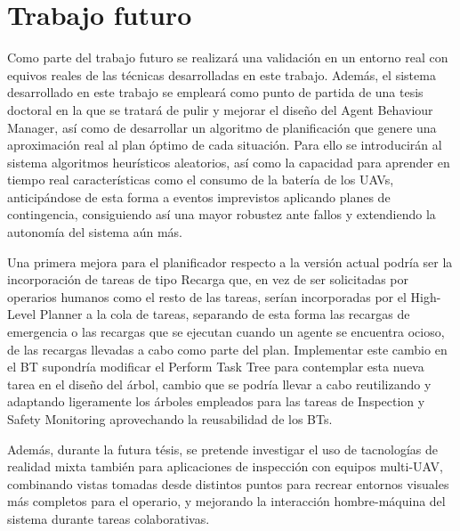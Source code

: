 \documentclass[fontsize=11pt, English=false, Español=true, Myfinal=true, twoside, numbers=noenddot]{scrbook}
\begin{document}
\section{Trabajo futuro}
\label{sec:FutureWork}
Como parte del trabajo futuro se realizará una validación en un entorno real con equivos reales de las técnicas desarrolladas en este trabajo. Además, el sistema desarrollado en este trabajo se empleará como punto de partida de una tesis doctoral en la que se tratará de pulir y mejorar el diseño del Agent Behaviour Manager, así como de desarrollar un algoritmo de planificación que genere una aproximación real al plan óptimo de cada situación. Para ello se introducirán al sistema algoritmos heurísticos aleatorios, así como la capacidad para aprender en tiempo real características como el consumo de la batería de los UAVs, anticipándose de esta forma a eventos imprevistos aplicando planes de contingencia, consiguiendo así una mayor robustez ante fallos y extendiendo la autonomía del sistema aún más.

Una primera mejora para el planificador respecto a la versión actual podría ser la incorporación de tareas de tipo Recarga que, en vez de ser solicitadas por operarios humanos como el resto de las tareas, serían incorporadas por el High-Level Planner a la cola de tareas, separando de esta forma las recargas de emergencia o las recargas que se ejecutan cuando un agente se encuentra ocioso, de las recargas llevadas a cabo como parte del plan. Implementar este cambio en el BT supondría modificar el Perform Task Tree para contemplar esta nueva tarea en el diseño del árbol, cambio que se podría llevar a cabo reutilizando y adaptando ligeramente los árboles empleados para las tareas de Inspection y Safety Monitoring aprovechando la reusabilidad de los BTs.

Además, durante la futura tésis, se pretende investigar el uso de tacnologías de realidad mixta también para aplicaciones de inspección con equipos multi-UAV, combinando vistas tomadas desde distintos puntos para recrear entornos visuales más completos para el operario, y mejorando la interacción hombre-máquina del sistema durante tareas colaborativas.


%
%
\end{document}
